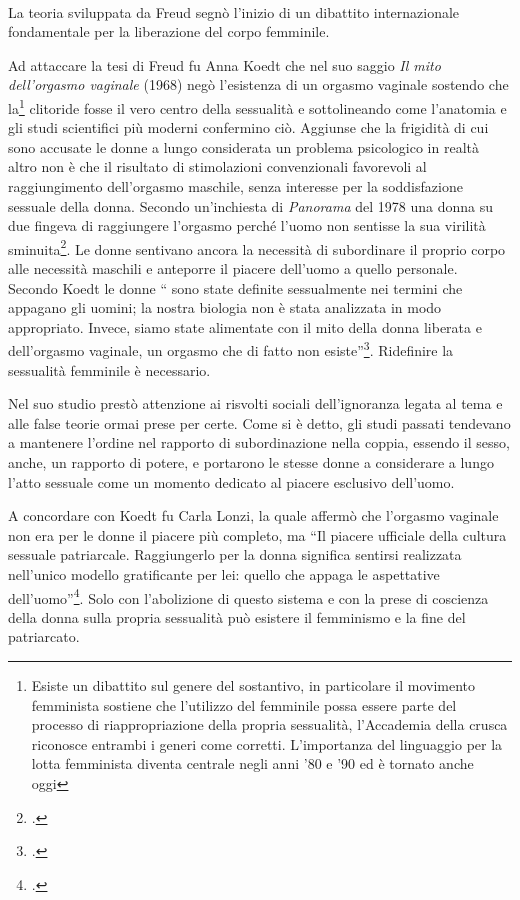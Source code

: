 \paragraph{}La teoria sviluppata da Freud segnò l'inizio di un dibattito internazionale fondamentale per la liberazione del corpo femminile.

Ad attaccare la tesi di Freud fu Anna Koedt che nel suo saggio \textit{Il mito dell'orgasmo vaginale} (1968) negò l'esistenza di un orgasmo vaginale sostendo che la\footnote{Esiste un dibattito sul genere del sostantivo, in particolare il movimento femminista sostiene che l'utilizzo del femminile possa essere parte del processo di riappropriazione della propria sessualità, l'Accademia della crusca riconosce entrambi i generi come corretti. L'importanza del linguaggio per la lotta femminista diventa centrale negli anni '80 e '90 ed è tornato anche oggi} clitoride fosse il vero centro della sessualità e sottolineando come l'anatomia e gli studi scientifici più moderni confermino ciò.
Aggiunse che la frigidità di cui sono accusate le donne a lungo considerata un problema psicologico in realtà altro non è che il risultato di stimolazioni convenzionali favorevoli al raggiungimento dell'orgasmo maschile, senza interesse per la soddisfazione sessuale della donna.
Secondo un'inchiesta di \textit{Panorama} del 1978 una donna su due fingeva di raggiungere l'orgasmo perché l'uomo non sentisse la sua virilità sminuita\footcite{Balestracci4}.
Le donne sentivano ancora la necessità di subordinare il proprio corpo alle necessità maschili e anteporre il piacere dell'uomo a quello personale.
\\Secondo Koedt le donne \enquote{ sono state deﬁnite sessualmente nei termini che appagano gli uomini; la nostra biologia non è stata analizzata in modo appropriato. Invece, siamo state alimentate con il mito della donna liberata e dell'orgasmo vaginale, un orgasmo che di fatto non esiste}\footcite{Koedt}.
Ridefinire la sessualità femminile è necessario.

Nel suo studio prestò attenzione ai risvolti sociali dell'ignoranza legata al tema e alle false teorie ormai prese per certe.
Come si è detto, gli studi passati tendevano a mantenere l'ordine nel rapporto di subordinazione nella coppia, essendo il sesso, anche, un rapporto di potere, e portarono le stesse donne a considerare a lungo l'atto sessuale come un momento dedicato al piacere esclusivo dell'uomo.

A concordare con Koedt fu Carla Lonzi, la quale affermò che l'orgasmo vaginale non era per le donne il piacere più completo, ma \enquote{Il piacere ufficiale della cultura sessuale patriarcale. Raggiungerlo per la donna significa sentirsi realizzata nell’unico modello gratificante per lei: quello che appaga le aspettative dell’uomo}\footcite{Lonzi}.
Solo con l'abolizione di questo sistema e con la prese di coscienza della donna sulla propria sessualità può esistere il femminismo e la fine del patriarcato.


